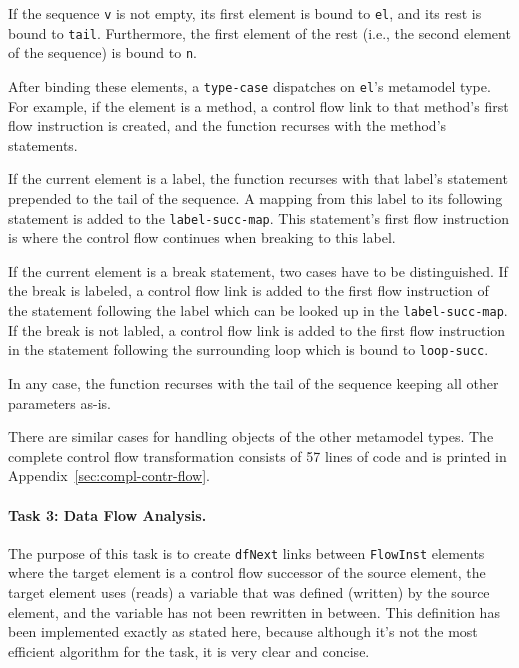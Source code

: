 \documentclass[submission]{eptcs}
\begin{document}


If the sequence \verb|v| is not empty, its first element is bound to \verb|el|,
and its rest is bound to \verb|tail|.  Furthermore, the first element of the
rest (i.e., the second element of the sequence) is bound to \verb|n|.

After binding these elements, a \verb|type-case| dispatches on \verb|el|'s
metamodel type.  For example, if the element is a method, a control flow link
to that method's first flow instruction is created, and the function recurses
with the method's statements.



If the current element is a label, the function recurses with that label's
statement prepended to the tail of the sequence.  A mapping from this label to
its following statement is added to the \verb|label-succ-map|.  This
statement's first flow instruction is where the control flow continues when
breaking to this label.



If the current element is a break statement, two cases have to be
distinguished.  If the break is labeled, a control flow link is added to the
first flow instruction of the statement following the label which can be looked
up in the \verb|label-succ-map|.  If the break is not labled, a control flow
link is added to the first flow instruction in the statement following the
surrounding loop which is bound to \verb|loop-succ|.

In any case, the function recurses with the tail of the sequence keeping all
other parameters as-is.



There are similar cases for handling objects of the other metamodel types.  The
complete control flow transformation consists of 57 lines of code and is
printed in Appendix~\ref{sec:compl-contr-flow}.


\paragraph{Task 3: Data Flow Analysis.}
\label{sec:task-3}

The purpose of this task is to create \verb|dfNext| links between
\verb|FlowInst| elements where the target element is a control flow successor
of the source element, the target element uses (reads) a variable that was
defined (written) by the source element, and the variable has not been
rewritten in between.  This definition has been implemented exactly as stated
here, because although it's not the most efficient algorithm for the task, it
is very clear and concise.
\end{document}
